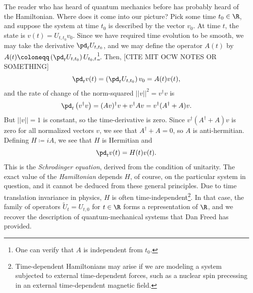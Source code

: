 The reader who has heard of quantum mechanics before has probably heard of the Hamiltonian. Where does it come into our picture? Pick some time $t_0 \in \R$, and suppose the system at time $t_0$ is described by the vector $v_0$. At time $t$, the state is $v(t) = U_{t, t_0}v_0$. Since we have required time evolution to be smooth, we may take the derivative $\pd_t U_{t, t_0}$, and we may define the operator $A(t)$ by $A(t) \coloneqq \left(\pd_t U_{t, t_0}\right)U_{t_0, t}$\footnote{One can verify that $A$ is independent from $t_0$.}. Then, [CITE MIT OCW NOTES OR SOMETHING]
\begin{equation*}
    \pd_t v(t) = \left(\pd_t U_{t, t_0}\right) v_0 = A(t) v(t),
\end{equation*}
and the rate of change of the norm-squared $||v||^2 = v^\dag v$ is
\begin{equation*}
    \pd_t \left(v^\dag v\right) = (A v)^\dag v + v^\dag A v = v^\dag(A^\dag + A) v.
\end{equation*}
But $||v|| = 1$ is constant, so the time-derivative is zero. Since $v^\dag(A^\dag + A) v$ is zero for all normalized vectors $v$, we see that $A^\dag + A = 0$, so $A$ is anti-hermitian. Defining $H \coloneqq i A$, we see that $H$ is Hermitian and
\begin{equation*}
    \pd_t v(t) = H(t) v(t).
\end{equation*}
This is the \emph{Schrodinger equation}, derived from the condition of unitarity. The exact value of the \emph{Hamiltonian} depends $H$, of course, on the particular system in question, and it cannot be deduced from these general principles. Due to time translation invariance in physics, $H$ is often time-independent\footnote{Time-dependent Hamiltonians may arise if we are modeling a system subjected to external time-dependent forces, such as a nuclear spin precessing in an external time-dependent magnetic field.}. In that case, the family of operators $\tilde U_t = U_{t, 0}$ for $t \in \R$ forms a representation of $\R$, and we recover the description of quantum-mechanical systems that Dan Freed has provided.

